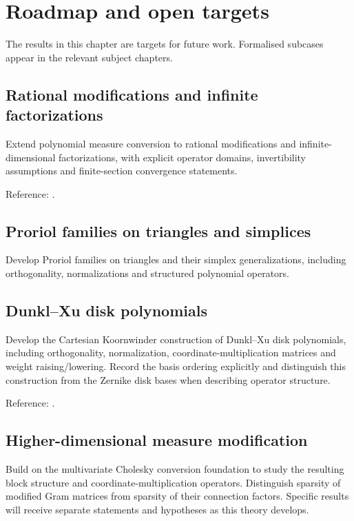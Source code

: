 \chapter{Roadmap and open targets}\label{chap:not-yet-covered}
The results in this chapter are targets for future work. Formalised subcases
appear in the relevant subject chapters.

\section{Rational modifications and infinite factorizations}\label{thm:rational-infinite-modification}
Extend polynomial measure conversion to rational modifications and
infinite-dimensional factorizations, with explicit operator domains,
invertibility assumptions and finite-section convergence statements.

Reference: \cite[Section 2]{gutleb-olver-slevinsky}.



\section{Proriol families on triangles and simplices}\label{thm:proriol-polynomials}
Develop Proriol families on triangles and their simplex generalizations, including
orthogonality, normalizations and structured polynomial operators.

\section{Dunkl--Xu disk polynomials}\label{thm:dunkl-xu-disk-polynomials}
Develop the Cartesian Koornwinder construction of Dunkl--Xu disk polynomials,
including orthogonality, normalization, coordinate-multiplication matrices and
weight raising/lowering. Record the basis ordering explicitly and distinguish
this construction from the Zernike disk bases when describing operator structure.

Reference: \cite{dunkl-xu}.

\section{Higher-dimensional measure modification}\label{thm:multivariate-measure-modification}
Build on the multivariate Cholesky conversion foundation to study the resulting
block structure and coordinate-multiplication operators. Distinguish sparsity of
modified Gram matrices from sparsity of their connection factors. Specific
results will receive separate statements and hypotheses as this theory develops.

